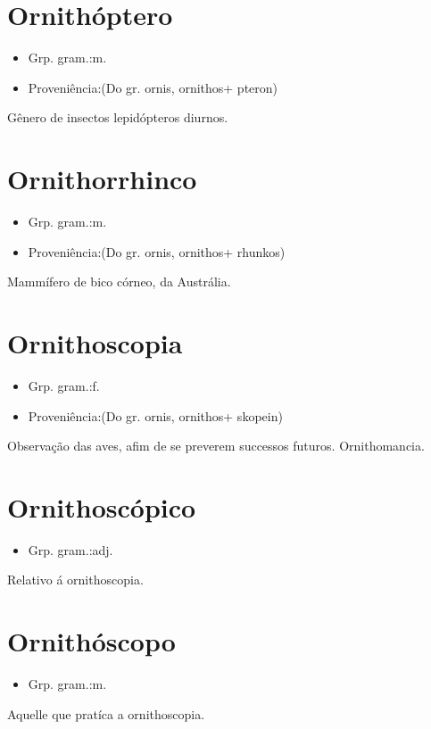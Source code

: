 \section{Ornithóptero}
\begin{itemize}
\item {Grp. gram.:m.}
\end{itemize}
\begin{itemize}
\item {Proveniência:(Do gr. \textunderscore ornis\textunderscore , \textunderscore ornithos\textunderscore  + \textunderscore pteron\textunderscore )}
\end{itemize}
Gênero de insectos lepidópteros diurnos.
\section{Ornithorrhinco}
\begin{itemize}
\item {Grp. gram.:m.}
\end{itemize}
\begin{itemize}
\item {Proveniência:(Do gr. \textunderscore ornis\textunderscore , \textunderscore ornithos\textunderscore  + \textunderscore rhunkos\textunderscore )}
\end{itemize}
Mammífero de bico córneo, da Austrália.
\section{Ornithoscopia}
\begin{itemize}
\item {Grp. gram.:f.}
\end{itemize}
\begin{itemize}
\item {Proveniência:(Do gr. \textunderscore ornis\textunderscore , \textunderscore ornithos\textunderscore  + \textunderscore skopein\textunderscore )}
\end{itemize}
Observação das aves, afim de se preverem successos futuros.
Ornithomancia.
\section{Ornithoscópico}
\begin{itemize}
\item {Grp. gram.:adj.}
\end{itemize}
Relativo á ornithoscopia.
\section{Ornithóscopo}
\begin{itemize}
\item {Grp. gram.:m.}
\end{itemize}
Aquelle que pratíca a ornithoscopia.
